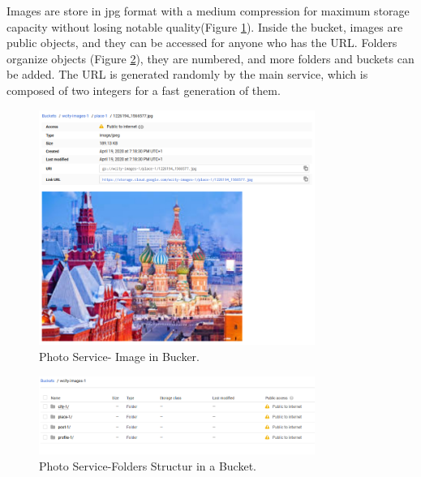 Images are store in jpg format with a medium compression for maximum storage capacity without losing notable quality(Figure \ref{photo:buckerimage}).
Inside the bucket, images are public objects, and they can be accessed for anyone who has the URL. Folders organize objects (Figure \ref{photo:bucketfolder}), they are numbered, and more folders and buckets can be added.
The URL is generated randomly by the main service, which is composed of two integers for a fast generation of them.



\begin{figure}
	\begin{center}
		\includegraphics[width=90mm,scale=1]{img/photos/image-xample.png}
		\caption{Photo Service- Image in Bucker.}
		\label{photo:buckerimage}
	\end{center}
\end{figure}



\begin{figure}
	\begin{center}
		\includegraphics[width=90mm,scale=1]{img/photos/bucket-folders.png}
		\caption{Photo Service-Folders Structur in a Bucket.}
		\label{photo:bucketfolder}
	\end{center}
\end{figure}

